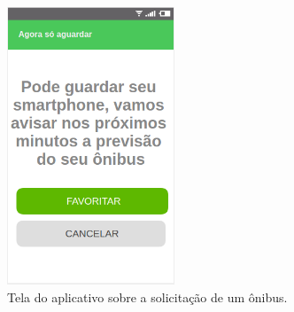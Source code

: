 \documentclass[
	12pt,				%
	oneside,			%
	a4paper,			%
	brazil				%
]{abntex2}
\begin{document}
\begin{figure}[!h]
\centering
\includegraphics[width=5cm, center]{images/tela-5-acompanhamento-do-onibus.PNG}
\caption{Tela do aplicativo sobre a solicitação de um ônibus.}
\label{Rotulo}
\end{figure}
\end{document}
